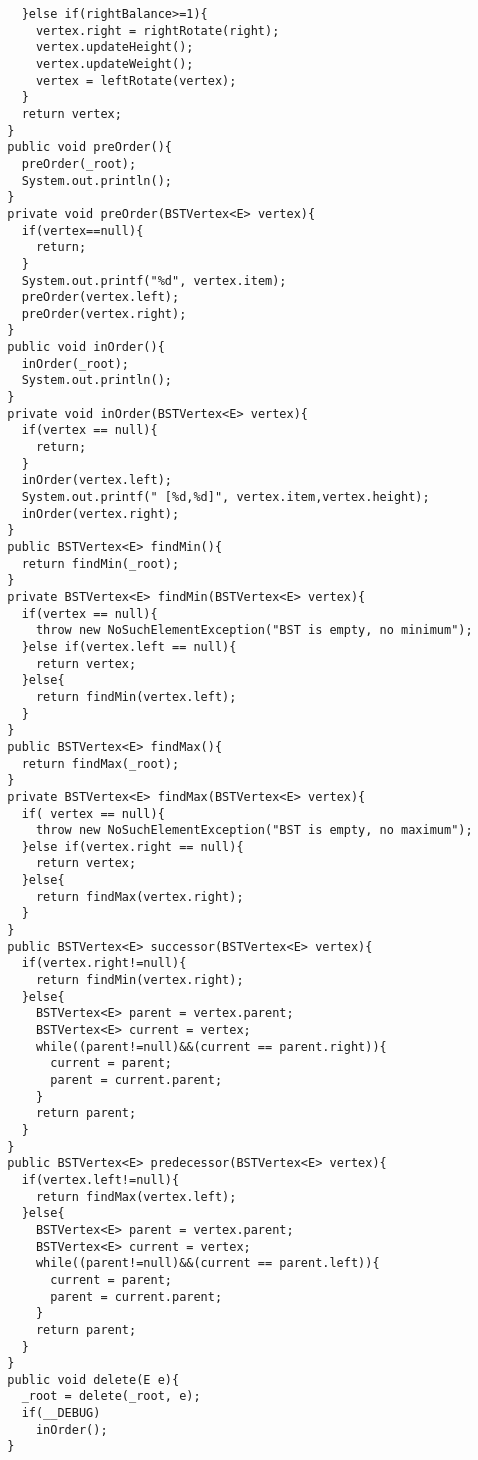 \documentclass[11pt]{article}
\theoremstyle{definition}
\begin{document}
\begin{verbatim}
    }else if(rightBalance>=1){
      vertex.right = rightRotate(right);
      vertex.updateHeight();
      vertex.updateWeight();
      vertex = leftRotate(vertex);
    }
    return vertex;
  }
  public void preOrder(){
    preOrder(_root);
    System.out.println();
  }
  private void preOrder(BSTVertex<E> vertex){
    if(vertex==null){
      return;
    }
    System.out.printf("%d", vertex.item);
    preOrder(vertex.left);
    preOrder(vertex.right);
  }
  public void inOrder(){
    inOrder(_root);
    System.out.println();
  }
  private void inOrder(BSTVertex<E> vertex){
    if(vertex == null){
      return;
    }
    inOrder(vertex.left);
    System.out.printf(" [%d,%d]", vertex.item,vertex.height);
    inOrder(vertex.right);
  }
  public BSTVertex<E> findMin(){
    return findMin(_root);
  }
  private BSTVertex<E> findMin(BSTVertex<E> vertex){
    if(vertex == null){
      throw new NoSuchElementException("BST is empty, no minimum");
    }else if(vertex.left == null){
      return vertex;
    }else{
      return findMin(vertex.left);
    }
  }
  public BSTVertex<E> findMax(){
    return findMax(_root);
  }
  private BSTVertex<E> findMax(BSTVertex<E> vertex){
    if( vertex == null){
      throw new NoSuchElementException("BST is empty, no maximum");
    }else if(vertex.right == null){
      return vertex;
    }else{
      return findMax(vertex.right);
    }
  }
  public BSTVertex<E> successor(BSTVertex<E> vertex){
    if(vertex.right!=null){
      return findMin(vertex.right);
    }else{
      BSTVertex<E> parent = vertex.parent;
      BSTVertex<E> current = vertex;
      while((parent!=null)&&(current == parent.right)){
        current = parent;
        parent = current.parent;
      }
      return parent;
    }
  }
  public BSTVertex<E> predecessor(BSTVertex<E> vertex){
    if(vertex.left!=null){
      return findMax(vertex.left);
    }else{
      BSTVertex<E> parent = vertex.parent;
      BSTVertex<E> current = vertex;
      while((parent!=null)&&(current == parent.left)){
        current = parent;
        parent = current.parent;
      }
      return parent;
    }
  }
  public void delete(E e){
    _root = delete(_root, e);
    if(__DEBUG)
      inOrder();
  }
  

\end{verbatim}
\end{document}

